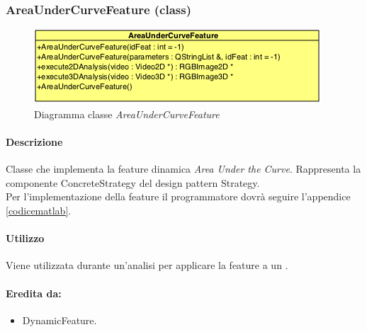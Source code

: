 \begin{itemize}
	\end{itemize}

\color{black}
\pagebreak
\subsubsection{AreaUnderCurveFeature (class)}
\label{AreaUnderCurveFeature}

\begin{figure}[!h]
\centering
			\includegraphics[scale=1]{./Content/Immagini/modelCore/AreaUnderCurveFeature.png}
			\caption{Diagramma classe \textsl{AreaUnderCurveFeature}}
			\label{AreaUnderCurve_img}
\end{figure}

\paragraph{Descrizione \\} Classe che implementa la feature\g{} dinamica \textit{Area Under the Curve}. Rappresenta la componente ConcreteStrategy del design pattern\g{} Strategy.
\\Per l'implementazione della feature\g{} il programmatore dovrà seguire l'appendice \ref{codicematlab}.

\paragraph{Utilizzo\\} Viene utilizzata durante un'analisi per applicare la feature\g{} a un \dataset{}.

\paragraph{Eredita da:}
\begin{itemize}
	\item DynamicFeature.
\end{itemize}


